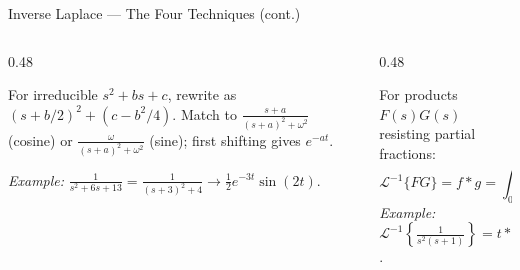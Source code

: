 \documentclass[aspectratio=169,11pt]{beamer}
\begin{document}
\begin{frame}{Inverse Laplace --- The Four Techniques (cont.)}
\footnotesize
\begin{columns}[T]
\begin{column}{0.48\textwidth}
\begin{methodbox}
For irreducible $s^2+bs+c$, rewrite as $(s+b/2)^2 + (c-b^2/4)$. Match to $\frac{s+a}{(s+a)^2+\omega^2}$ (cosine) or $\frac{\omega}{(s+a)^2+\omega^2}$ (sine); first shifting gives $e^{-at}$.

\medskip
\emph{Example:} $\frac{1}{s^2+6s+13} = \frac{1}{(s+3)^2+4} \to \tfrac{1}{2}e^{-3t}\sin(2t)$.
\end{methodbox}
\end{column}
\begin{column}{0.48\textwidth}
\begin{methodbox}
For products $F(s)G(s)$ resisting partial fractions:
\[\mathcal{L}^{-1}\{FG\} = f * g = \int_0^t f(\tau)\,g(t-\tau)\,d\tau\]
\emph{Example:} $\mathcal{L}^{-1}\!\left\{\frac{1}{s^2(s+1)}\right\} = t * e^{-t} = t + e^{-t} - 1$.
\end{methodbox}
\end{column}
\end{columns}
\end{frame}
\end{document}
